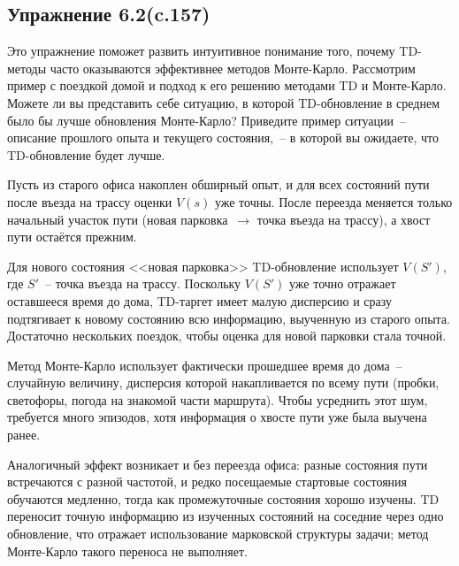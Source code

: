 \subsection{Упражнение 6.2(c.157)}
Это упражнение поможет развить интуитивное понимание того, почему TD-методы часто оказываются эффективнее методов Монте-Карло. Рассмотрим пример с поездкой домой и подход к его решению методами TD и Монте-Карло. Можете ли вы представить себе ситуацию, в которой TD-обновление в среднем было бы лучше обновления Монте-Карло? Приведите пример ситуации~-- описание прошлого опыта и текущего состояния,~-- в которой вы ожидаете, что TD-обновление будет лучше. 
\begin{solution}
    Пусть из старого офиса накоплен обширный опыт, и для всех состояний пути после въезда на трассу оценки $V(s)$ уже точны. После переезда меняется только начальный участок пути (новая парковка~$\to$ точка въезда на трассу), а хвост пути остаётся прежним.

    Для нового состояния <<новая парковка>> TD-обновление использует $V(S')$, где $S'$~-- точка въезда на трассу. Поскольку $V(S')$ уже точно отражает оставшееся время до дома, TD-таргет имеет малую дисперсию и сразу подтягивает к новому состоянию всю информацию, выученную из старого опыта. Достаточно нескольких поездок, чтобы оценка для новой парковки стала точной.

    Метод Монте-Карло использует фактически прошедшее время до дома~-- случайную величину, дисперсия которой накапливается по всему пути (пробки, светофоры, погода на знакомой части маршрута). Чтобы усреднить этот шум, требуется много эпизодов, хотя информация о хвосте пути уже была выучена ранее.

    Аналогичный эффект возникает и без переезда офиса: разные состояния пути встречаются с разной частотой, и редко посещаемые стартовые состояния обучаются медленно, тогда как промежуточные состояния хорошо изучены. TD переносит точную информацию из изученных состояний на соседние через одно обновление, что отражает использование марковской структуры задачи; метод Монте-Карло такого переноса не выполняет.
\end{solution}

